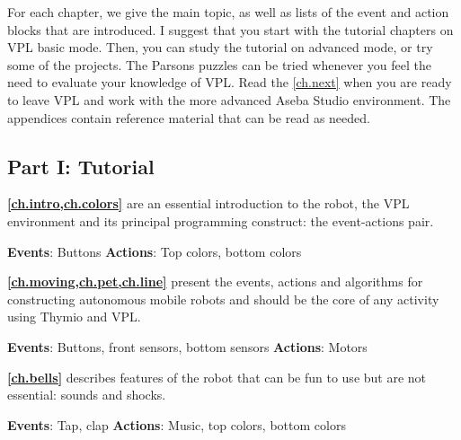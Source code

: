 \newpage


For each chapter, we give the main topic, as well as lists of the event
and action blocks that are introduced. I suggest that you start with the
tutorial chapters on VPL basic mode. Then, you can study the tutorial on
advanced mode, or try some of the projects. The Parsons puzzles can be
tried whenever you feel the need to evaluate your knowledge of VPL.
Read the \cref{ch.next} when you are ready to leave VPL and work with
the more advanced Aseba Studio environment. The appendices contain
reference material that can be read as needed.

\subsection*{Part I: Tutorial}

\textbf{\cref{ch.intro,ch.colors}} are an essential
introduction to the robot, the VPL environment and its principal
programming construct: the event-actions pair.

\textbf{Events}: Buttons \hfill \textbf{Actions}: Top colors, bottom colors

 \hfill {} \quad {}

\medskip

\textbf{\cref{ch.moving,ch.pet,ch.line}} present the events,
actions and algorithms for constructing autonomous mobile robots and
should be the core of any activity using Thymio and VPL.

\textbf{Events}: Buttons, front sensors, bottom sensors \hfill
\textbf{Actions}: Motors

 \quad{}\quad {} \hfill
{}

\medskip

\textbf{\cref{ch.bells}} describes features of the robot that can
be fun to use but are not essential: sounds and shocks.

\textbf{Events}: Tap, clap \hfill \textbf{Actions}: Music, top colors,
bottom colors

 \quad {} \hfill {}
\quad {} \quad {}

\medskip


